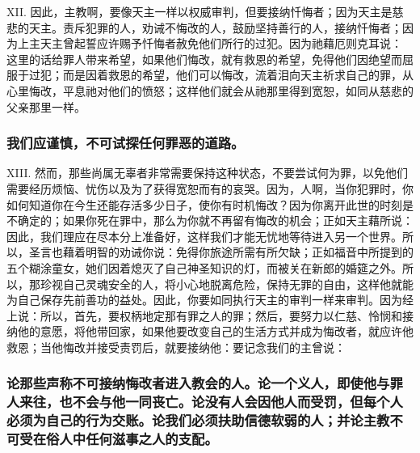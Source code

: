 XII. 因此，主教啊，要像天主一样以权威审判，但要接纳忏悔者；因为天主是慈悲的天主。责斥犯罪的人，劝诫不悔改的人，鼓励坚持善行的人，接纳忏悔者；因为上主天主曾起誓应许赐予忏悔者赦免他们所行的过犯。因为祂藉厄则克耳说： 这里的话给罪人带来希望，如果他们悔改，就有救恩的希望，免得他们因绝望而屈服于过犯；而是因着救恩的希望，他们可以悔改，流着泪向天主祈求自己的罪，从心里悔改，平息祂对他们的愤怒；这样他们就会从祂那里得到宽恕，如同从慈悲的父亲那里一样。\par


\subsubsection{我们应谨慎，不可试探任何罪恶的道路。}

XIII. 然而，那些尚属无辜者非常需要保持这种状态，不要尝试何为罪，以免他们需要经历烦恼、忧伤以及为了获得宽恕而有的哀哭。因为，人啊，当你犯罪时，你如何知道你在今生还能存活多少日子，使你有时机悔改？因为你离开此世的时刻是不确定的；如果你死在罪中，那么为你就不再留有悔改的机会；正如天主藉所说：因此，我们理应在尽本分上准备好，这样我们才能无忧地等待进入另一个世界。所以，圣言也藉着明智的劝诫你说：免得你旅途所需有所欠缺；正如福音中所提到的五个糊涂童女，她们因着熄灭了自己神圣知识的灯，而被关在新郎的婚筵之外。所以，那珍视自己灵魂安全的人，将小心地脱离危险，保持无罪的自由，这样他就能为自己保存先前善功的益处。因此，你要如同执行天主的审判一样来审判。因为经上说：所以，首先，要权柄地定那有罪之人的罪；然后，要努力以仁慈、怜悯和接纳他的意愿，将他带回家，如果他要改变自己的生活方式并成为悔改者，就应许他救恩；当他悔改并接受责罚后，就要接纳他：要记念我们的主曾说：\par


\subsubsection{论那些声称不可接纳悔改者进入教会的人。论一个义人，即使他与罪人来往，也不会与他一同丧亡。论没有人会因他人而受罚，但每个人必须为自己的行为交账。论我们必须扶助信德软弱的人；并论主教不可受在俗人中任何滋事之人的支配。}

